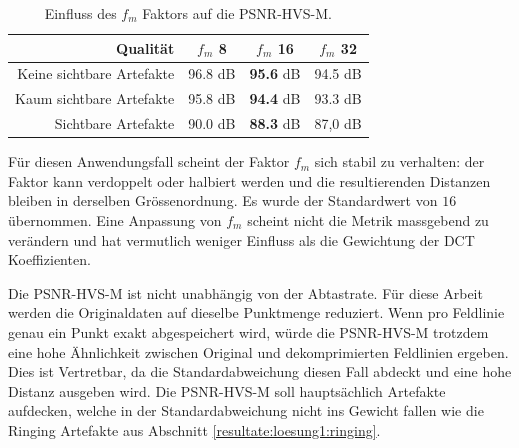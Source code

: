 \begin{table}[!htbp]
\center
\begin{tabular}{r|c|c|c}
	Qualität &$f_m$ 8 &$f_m$ 16 &$f_m$ 32 \\\hline
	Keine sichtbare Artefakte & 96.8 dB & \textbf{95.6} dB& 94.5 dB \\
	Kaum sichtbare Artefakte & 95.8 dB & \textbf{94.4} dB& 93.3 dB\\
  Sichtbare Artefakte & 90.0 dB & \textbf{88.3} dB & 87,0 dB
\end{tabular}
\caption{Einfluss des $f_m$ Faktors auf die PSNR-HVS-M.}
\label{testsetup:psnr:umsetzung:tabelle:f_m}
\end{table}
Für diesen Anwendungsfall scheint der Faktor $f_m$ sich stabil zu verhalten: der Faktor kann verdoppelt oder halbiert werden und die resultierenden Distanzen bleiben in derselben Grössenordnung. Es wurde der Standardwert von $16$ übernommen. Eine Anpassung von $f_m$ scheint nicht die Metrik massgebend zu verändern und hat vermutlich weniger Einfluss als die Gewichtung der DCT Koeffizienten.

Die PSNR-HVS-M ist nicht unabhängig von der Abtastrate. Für diese Arbeit werden die Originaldaten auf dieselbe Punktmenge reduziert. Wenn pro Feldlinie genau ein Punkt exakt abgespeichert wird, würde die PSNR-HVS-M trotzdem eine hohe Ähnlichkeit zwischen Original und dekomprimierten Feldlinien ergeben. Dies ist Vertretbar, da die Standardabweichung diesen Fall abdeckt und eine hohe Distanz ausgeben wird. Die PSNR-HVS-M soll hauptsächlich Artefakte aufdecken, welche in der Standardabweichung nicht ins Gewicht fallen wie die Ringing Artefakte aus Abschnitt \ref{resultate:loesung1:ringing}.
